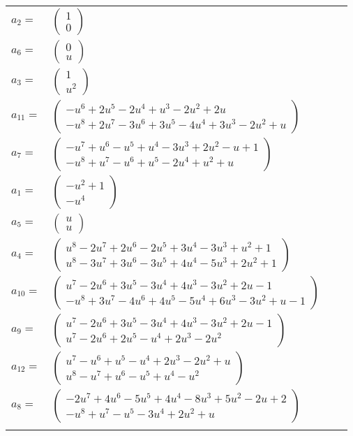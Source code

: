 \documentclass[1p]{elsarticle_modified}
\theoremstyle{definition}
\begin{document}
\begin{tabular}{m{7pt} m{180pt} m{7pt} m{180pt} }
\flushright $a_{2}=$&$\begin{pmatrix}1\\0\end{pmatrix}$ \\
\flushright $a_{6}=$&$\begin{pmatrix}0\\u\end{pmatrix}$ \\
\flushright $a_{3}=$&$\begin{pmatrix}1\\u^2\end{pmatrix}$ \\
\flushright $a_{11}=$&$\begin{pmatrix}- u^6+2 u^5-2 u^4+u^3-2 u^2+2 u\\- u^8+2 u^7-3 u^6+3 u^5-4 u^4+3 u^3-2 u^2+u\end{pmatrix}$ \\
\flushright $a_{7}=$&$\begin{pmatrix}- u^7+u^6- u^5+u^4-3 u^3+2 u^2- u+1\\- u^8+u^7- u^6+u^5-2 u^4+u^2+u\end{pmatrix}$ \\
\flushright $a_{1}=$&$\begin{pmatrix}- u^2+1\\- u^4\end{pmatrix}$ \\
\flushright $a_{5}=$&$\begin{pmatrix}u\\u\end{pmatrix}$ \\
\flushright $a_{4}=$&$\begin{pmatrix}u^8-2 u^7+2 u^6-2 u^5+3 u^4-3 u^3+u^2+1\\u^8-3 u^7+3 u^6-3 u^5+4 u^4-5 u^3+2 u^2+1\end{pmatrix}$ \\
\flushright $a_{10}=$&$\begin{pmatrix}u^7-2 u^6+3 u^5-3 u^4+4 u^3-3 u^2+2 u-1\\- u^8+3 u^7-4 u^6+4 u^5-5 u^4+6 u^3-3 u^2+u-1\end{pmatrix}$ \\
\flushright $a_{9}=$&$\begin{pmatrix}u^7-2 u^6+3 u^5-3 u^4+4 u^3-3 u^2+2 u-1\\u^7-2 u^6+2 u^5- u^4+2 u^3-2 u^2\end{pmatrix}$ \\
\flushright $a_{12}=$&$\begin{pmatrix}u^7- u^6+u^5- u^4+2 u^3-2 u^2+u\\u^8- u^7+u^6- u^5+u^4- u^2\end{pmatrix}$ \\
\flushright $a_{8}=$&$\begin{pmatrix}-2 u^7+4 u^6-5 u^5+4 u^4-8 u^3+5 u^2-2 u+2\\- u^8+u^7- u^5-3 u^4+2 u^2+u\end{pmatrix}$\\&\end{tabular}
\end{document}
